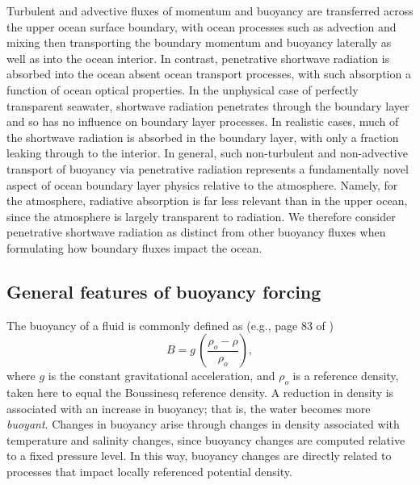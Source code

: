 Turbulent and advective fluxes of momentum and buoyancy are
transferred across the upper ocean surface boundary, with ocean
processes such as advection and mixing then transporting the boundary
momentum and buoyancy laterally as well as into the ocean interior.
In contrast, penetrative shortwave radiation is absorbed into the
ocean absent ocean transport processes, with such absorption a
function of ocean optical properties.  In the unphysical case of
perfectly transparent seawater, shortwave radiation penetrates through
the boundary layer and so has no influence on boundary layer
processes.  In realistic cases, much of the shortwave radiation is
absorbed in the boundary layer, with only a fraction leaking through
to the interior. In general, such non-turbulent and non-advective
transport of buoyancy via penetrative radiation represents a
fundamentally novel aspect of ocean boundary layer physics relative to
the atmosphere.  Namely, for the atmosphere, radiative absorption is
far less relevant than in the upper ocean, since the atmosphere is
largely transparent to radiation.  We therefore consider penetrative
shortwave radiation as distinct from other buoyancy fluxes when
formulating how boundary fluxes impact the ocean.


\subsection{General features of buoyancy forcing}

The buoyancy of a fluid is commonly defined as (e.g., page 83 of
\cite{LargeKPP_lectures})
\begin{equation}
 B = g \, \left( \frac{ \rho_{o} - \rho}{\rho_{o}} \right), 
\label{eq:buoyancy-kpp}
\end{equation}
where $g$ is the constant gravitational acceleration, and $\rho_{o}$
is a reference density, taken here to equal the Boussinesq reference
density.  A reduction in density is associated with an increase in
buoyancy; that is, the water becomes more {\it buoyant}.  Changes in
buoyancy arise through changes in density associated with temperature
and salinity changes, since buoyancy changes are computed relative to
a fixed pressure level. In this way, buoyancy changes are directly
related to processes that impact locally referenced potential density.

